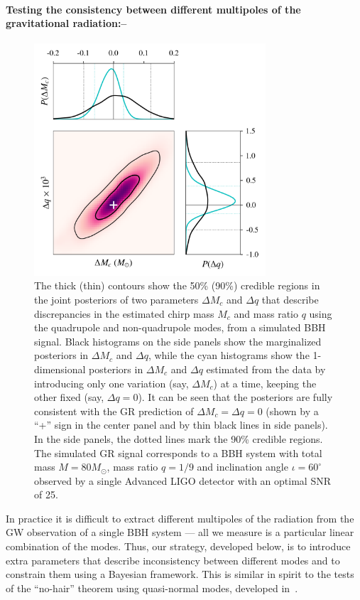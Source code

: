\documentclass[prl,preprintnumbers,twocolumn,eqsecnum,floatfix,a4paper,nofootinbib,superscriptaddress]{revtex4}
\begin{document}
\paragraph{Testing the consistency between different multipoles of the gravitational radiation:--}

\begin{figure}[tbh] \begin{center}
\includegraphics[width=3.4in]{figs/fig1_gr_9dim_abhi.png}
\caption{The thick (thin) contours show the 50\% (90\%) credible regions in the joint posteriors of two parameters $\Delta M_c$ and $\Delta q$ that describe discrepancies in the estimated chirp mass $M_c$ and mass ratio $q$ using the quadrupole and non-quadrupole modes, from a simulated BBH signal. Black histograms on the side panels show the marginalized posteriors in $\Delta M_c$ and $\Delta q$, while the cyan histograms show the 1-dimensional posteriors in $\Delta M_c$ and $\Delta q$ estimated from the data by introducing only one variation (say, $\Delta M_c$) at a time, keeping the other fixed (say, $\Delta q = 0$). It can be seen that the posteriors are fully consistent with the GR prediction of $\Delta M_c = \Delta q = 0$ (shown by a ``+'' sign in the center panel and by thin black lines in side panels). In the side panels, the dotted lines mark the 90\% credible regions. The simulated GR signal corresponds to a BBH system with total mass $M = {80}M_\odot$, mass ratio $q = 1/9$ and inclination angle $\iota = {60^\circ}$ observed by a single Advanced LIGO detector with an optimal SNR of 25. }
\label{fig:posterior_BBH_GR_inj}
\end{center} \end{figure}
In practice it is difficult to extract different multipoles of the radiation from the GW observation of a single BBH system --- all we measure is a particular linear combination of the modes. Thus, our strategy, developed below, is to introduce extra parameters that describe inconsistency between different modes and to constrain them using a Bayesian framework. This is similar in spirit to the tests of the ``no-hair'' theorem using quasi-normal modes, developed in~\cite{Gossan:2011ha,Meidam:2014jpa}.
\end{document}
